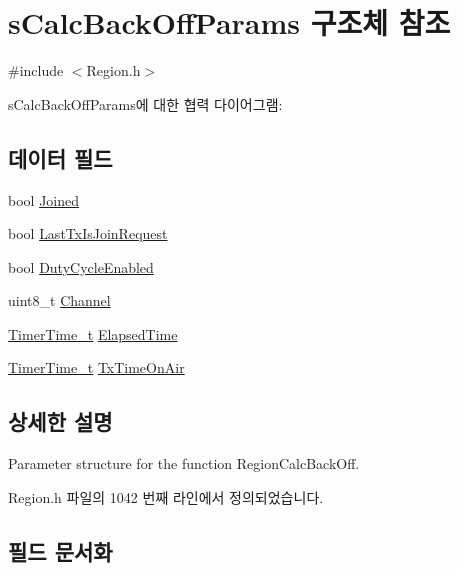 \hypertarget{structs_calc_back_off_params}{}\section{s\+Calc\+Back\+Off\+Params 구조체 참조}
\label{structs_calc_back_off_params}


{\ttfamily \#include $<$Region.\+h$>$}



s\+Calc\+Back\+Off\+Params에 대한 협력 다이어그램\+:
\subsection*{데이터 필드}
\begin{DoxyCompactItemize}
\item 
bool \mbox{\hyperlink{structs_calc_back_off_params_ac2f6caa0f3b02d2ac5056c3ee7c22652}{Joined}}
\item 
bool \mbox{\hyperlink{structs_calc_back_off_params_a4088d0ca2ff21fd5cdc110e14816dd53}{Last\+Tx\+Is\+Join\+Request}}
\item 
bool \mbox{\hyperlink{structs_calc_back_off_params_a4d755868e0e80089462286c3ba6a6f18}{Duty\+Cycle\+Enabled}}
\item 
uint8\+\_\+t \mbox{\hyperlink{structs_calc_back_off_params_a1ca6f01ca18afe402de51babe8c95f5e}{Channel}}
\item 
\mbox{\hyperlink{utilities_8h_a4215ca43d3e953099ea758ce428599d0}{Timer\+Time\+\_\+t}} \mbox{\hyperlink{structs_calc_back_off_params_a2ece30988e7a5bac284623173173c71a}{Elapsed\+Time}}
\item 
\mbox{\hyperlink{utilities_8h_a4215ca43d3e953099ea758ce428599d0}{Timer\+Time\+\_\+t}} \mbox{\hyperlink{structs_calc_back_off_params_aa17a8607485db100d315e74853dd217e}{Tx\+Time\+On\+Air}}
\end{DoxyCompactItemize}


\subsection{상세한 설명}
Parameter structure for the function Region\+Calc\+Back\+Off. 

Region.\+h 파일의 1042 번째 라인에서 정의되었습니다.



\subsection{필드 문서화}
\mbox{\label{structs_calc_back_off_params_a1ca6f01ca18afe402de51babe8c95f5e}} 
